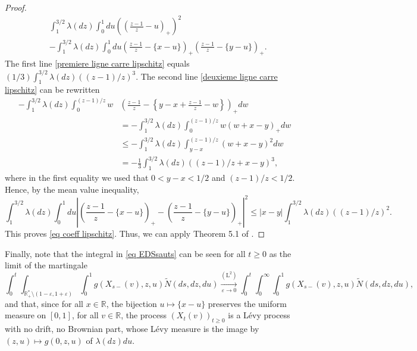 \documentclass[11pt]{article}
\numberwithin{equation}{section}
\def\vp{\varepsilon}
\def \R{\mathbb {R}}
\begin{document}
\begin{proof}
\begin{align}
	&\int_1^{3/2} \lambda(dz) \int_0^1 du \left(\left( \frac{z-1}{z}-u\right)_+\right)^2 \label{premiere ligne carre lipschitz}
	\\ 
	&-  \int_1^{3/2}\lambda(dz) \int_0^1 du
	\left( \frac{z-1}{z}  - \{x-u\} \right)_+\left( \frac{z-1}{z}  - \{y-u\} \right)_+ \label{deuxieme ligne carre lipschitz}.
	\end{align}
	The first line \eqref{premiere ligne carre lipschitz} equals $(1/3) \int_1^{3/2} \lambda(dz)((z-1)/z)^3$. The second line \eqref{deuxieme ligne carre lipschitz} can be rewritten
	\begin{align*}
	- \int_1^{3/2}\lambda(dz) \int_0^{(z-1)/z} w&\left( \frac{z-1}{z} - \left\{y-x+ \frac{z-1}{z}-w\right\} \right)_+ dw\\
	&= -  \int_1^{3/2} \lambda(dz) \int_0^{(z-1)/z} w(w+x-y)_+dw\\
	&\le -  \int_1^{3/2} \lambda(dz) \int_{y-x}^{(z-1)/z} (w+x-y)^2dw\\
	&= - \frac{1}{3} \int_1^{3/2} \lambda(dz) \left((z-1)/z+x-y \right)^3,
	\end{align*}
	where in the first equality we used that $0<y-x<1/2$ and $(z-1)/z<1/2$. 
	Hence, by the mean value inequality, 
	$$	\int_1^{3/2}\lambda(dz) \int_0^1du\left\vert \left( \frac{z-1}{z}-\{x-u\}\right)_+-\left( \frac{z-1}{z}-\{y-u\}\right)_+ \right\vert^2\le \vert x-y\vert \int_1^{3/2} \lambda(dz) ((z-1)/z)^2.$$ This proves \eqref{eq coeff lipschitz}. 
Thus, we can apply Theorem 5.1 of \cite{LP12}.
\end{proof}
Finally, note that the integral in \eqref{eq EDSsauts} can be seen for all $t\ge0$ as the limit of the martingale
$$
	\int_0^t \int_{\R^*_+\setminus(1-\vp,1+\vp)}\int_0^1 g({X}_{s-}(v), z,u) \widetilde{N}(ds,dz,du)
	\mathop{\longrightarrow}\limits_{\vp \to 0}^{(\mathrm{L}^2)}
	\int_0^t \int_0^\infty\int_0^1 g({X}_{s-}(v), z,u) \widetilde{N}(ds,dz,du),
$$
and that, since for all $x \in \R$, the bijection $u\mapsto \{x-u\}$ preserves the uniform measure on $[0,1]$, for all $v\in \R$, the process $(X_t(v))_{t\ge 0}$ is a Lévy process with no drift, no Brownian part, whose Lévy measure is the image by $(z,u)\mapsto g(0,z,u)$ of $\lambda(dz) du$.
\end{document}
